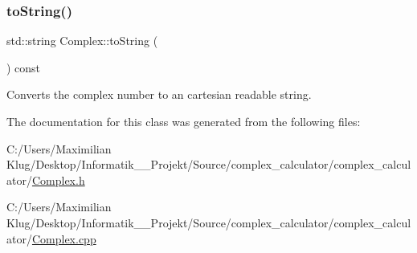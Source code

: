 \subsubsection{\texorpdfstring{to\+String()}{toString()}}
{\footnotesize\ttfamily std\+::string Complex\+::to\+String (\begin{DoxyParamCaption}{ }\end{DoxyParamCaption}) const}



Converts the complex number to an cartesian readable string. 



The documentation for this class was generated from the following files\+:\begin{DoxyCompactItemize}
\item 
C\+:/\+Users/\+Maximilian Klug/\+Desktop/\+Informatik\+\_\+\_\+\+Projekt/\+Source/complex\+\_\+calculator/complex\+\_\+calculator/\mbox{\hyperlink{_complex_8h}{Complex.\+h}}\item 
C\+:/\+Users/\+Maximilian Klug/\+Desktop/\+Informatik\+\_\+\_\+\+Projekt/\+Source/complex\+\_\+calculator/complex\+\_\+calculator/\mbox{\hyperlink{_complex_8cpp}{Complex.\+cpp}}\end{DoxyCompactItemize}
